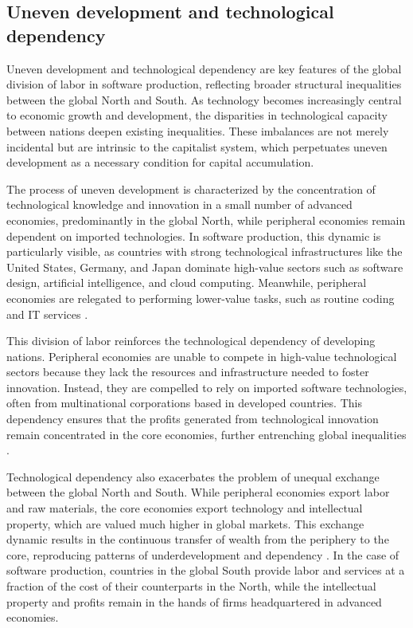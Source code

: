 \subsection{Uneven development and technological dependency}

Uneven development and technological dependency are key features of the global division of labor in software production, reflecting broader structural inequalities between the global North and South. As technology becomes increasingly central to economic growth and development, the disparities in technological capacity between nations deepen existing inequalities. These imbalances are not merely incidental but are intrinsic to the capitalist system, which perpetuates uneven development as a necessary condition for capital accumulation.

The process of uneven development is characterized by the concentration of technological knowledge and innovation in a small number of advanced economies, predominantly in the global North, while peripheral economies remain dependent on imported technologies. In software production, this dynamic is particularly visible, as countries with strong technological infrastructures like the United States, Germany, and Japan dominate high-value sectors such as software design, artificial intelligence, and cloud computing. Meanwhile, peripheral economies are relegated to performing lower-value tasks, such as routine coding and IT services \cite[pp.~114-116]{smith2016}. 

This division of labor reinforces the technological dependency of developing nations. Peripheral economies are unable to compete in high-value technological sectors because they lack the resources and infrastructure needed to foster innovation. Instead, they are compelled to rely on imported software technologies, often from multinational corporations based in developed countries. This dependency ensures that the profits generated from technological innovation remain concentrated in the core economies, further entrenching global inequalities \cite[pp.~205-207]{mosco2009}.

Technological dependency also exacerbates the problem of unequal exchange between the global North and South. While peripheral economies export labor and raw materials, the core economies export technology and intellectual property, which are valued much higher in global markets. This exchange dynamic results in the continuous transfer of wealth from the periphery to the core, reproducing patterns of underdevelopment and dependency \cite[pp.~134-136]{sassen2008}. In the case of software production, countries in the global South provide labor and services at a fraction of the cost of their counterparts in the North, while the intellectual property and profits remain in the hands of firms headquartered in advanced economies.

